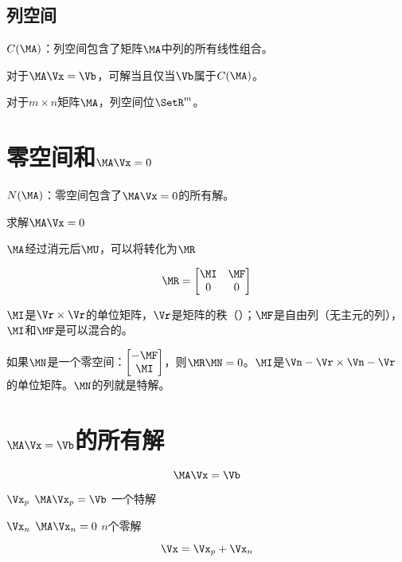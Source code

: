 \subsection{列空间}

 $C(\MA)$：列空间包含了矩阵$\MA$中列的所有线性组合。

对于$\MA\Vx = \Vb$，可解当且仅当$\Vb$属于$C(\MA)$。

对于$m \times n$矩阵$\MA$，列空间位$\SetR^{m}$。

\section{零空间和$\MA\Vx = 0$}

 $N(\MA)$：零空间包含了$\MA\Vx = 0$的所有解。

求解$\MA\Vx = 0$

$\MA$经过消元后$\MU$，可以将转化为$\MR$   


$$\MR = 
    \begin{bmatrix}
        \MI & \MF \\
        0 & 0 \\
    \end{bmatrix} 
$$

$\MI$是$\Vr \times \Vr$的单位矩阵，$\Vr$是矩阵的秩（）；$\MF$是自由列（无主元的列），$\MI$和$\MF$是可以混合的。

如果$\MN$是一个零空间：$\begin{bmatrix}
        -\MF \\
        \MI \\
    \end{bmatrix} $，则$\MR\MN = 0$。$\MI$是$\Vn-\Vr \times \Vn-\Vr$的单位矩阵。$\MN$的列就是特解。


\section{$\MA\Vx = \Vb$的所有解}

$$\MA\Vx = \Vb$$

$\Vx_{p}$  $\MA\Vx_{p} = \Vb$ 一个特解

$\Vx_{n}$  $\MA\Vx_{n} = 0$ $n$个零解

$$\Vx = \Vx_p + \Vx_n$$

